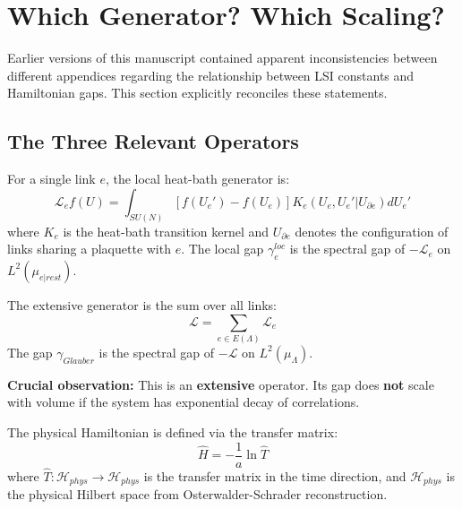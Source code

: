 \section{Which Generator? Which Scaling?}
\label{sec:generator_reconciliation}

\begin{remark}
Earlier versions of this manuscript contained apparent inconsistencies between different appendices regarding the relationship between LSI constants and Hamiltonian gaps. This section explicitly reconciles these statements.
\end{remark}

\subsection{The Three Relevant Operators}

\begin{definition}
\label{def:local_generator}
For a single link $e$, the local heat-bath generator is:
\begin{equation}
\mathcal{L}_e f(U) = \int_{SU(N)} [f(U_e') - f(U_e)] K_e(U_e, U_e' | U_{\partial e}) dU_e'
\end{equation}
where $K_e$ is the heat-bath transition kernel and $U_{\partial e}$ denotes the configuration of links sharing a plaquette with $e$. The local gap $\gamma_e^{loc}$ is the spectral gap of $-\mathcal{L}_e$ on $L^2(\mu_{e|rest})$.
\end{definition}

\begin{definition}
\label{def:extensive_generator}
The extensive generator is the sum over all links:
\begin{equation}
\mathcal{L} = \sum_{e \in E(\Lambda)} \mathcal{L}_e
\end{equation}
The gap $\gamma_{Glauber}$ is the spectral gap of $-\mathcal{L}$ on $L^2(\mu_\Lambda)$.

\textbf{Crucial observation:} This is an \textbf{extensive} operator. Its gap does \textbf{not} scale with volume if the system has exponential decay of correlations.
\end{definition}

\begin{definition}
\label{def:physical_hamiltonian}
The physical Hamiltonian is defined via the transfer matrix:
\begin{equation}
\hat{H} = -\frac{1}{a} \ln \hat{T}
\end{equation}
where $\hat{T}: \mathcal{H}_{phys} \to \mathcal{H}_{phys}$ is the transfer matrix in the time direction, and $\mathcal{H}_{phys}$ is the physical Hilbert space from Osterwalder-Schrader reconstruction.
\end{definition}

